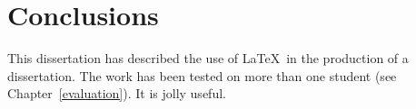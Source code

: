 \chapter{Conclusions}\label{conclusions}
This dissertation has described the use of \LaTeX\ in the production
of a dissertation. The work has been tested on more than one student
(see Chapter~\ref{evaluation}). It is jolly useful.
